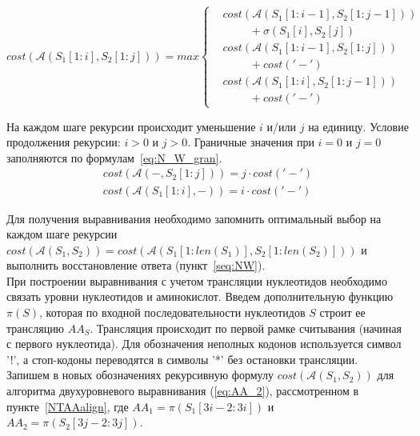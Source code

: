 \begin{equation}\label{eq:N_W_2}
cost(\mathcal{A}(S_1[1:i], S_2[1:j])) = max\left\{
\begin{aligned}
& cost(\mathcal{A}(S_1[1:i-1], S_2[1:j-1]))\\
& \hspace{1cm} + \sigma(S_1[i], S_2[j])\\
& cost(\mathcal{A}(S_1[1:i-1], S_2[1:j]))\\
& \hspace{1cm} + cost('-')\\
& cost(\mathcal{A}(S_1[1:i], S_2[1:j-1]))\\
& \hspace{1cm} + cost('-')
\end{aligned}
\right.
\end{equation}

\indent На каждом шаге рекурсии происходит уменьшение $i$ и/или $j$ на единицу. Условие продолжения рекурсии: $i > 0$ и $j > 0$. Граничные значения при $i=0$ и $j=0$ заполняются по формулам~\ref{eq:N_W_gran}.
\begin{equation}\label{eq:N_W_gran}
\begin{aligned}
cost(\mathcal{A}(-, S_2[1:j])) = j\cdot cost('-')\\
cost(\mathcal{A}(S_1[1:i], -)) = i\cdot cost('-')
\end{aligned}
\end{equation}

\indent Для получения выравнивания необходимо запомнить оптимальный выбор на каждом шаге рекурсии $cost(\mathcal{A}(S_1, S_2))=cost(\mathcal{A}(S_1[1:len(S_1)], S_2[1:len(S_2)]))$ и выполнить восстановление ответа (пункт~\ref{seq:NW}).\\
\indent При построении выравнивания с учетом трансляции нуклеотидов необходимо связать уровни нуклеотидов и аминокислот. Введем дополнительную функцию $\pi(S)$, которая по входной последовательности нуклеотидов $S$ строит ее трансляцию $AA_S$. Трансляция происходит по первой рамке считывания (начиная с первого нуклеотида). Для обозначения неполных кодонов используется символ '!', а стоп-кодоны переводятся в символы '*' без остановки трансляции.\\
\indent Запишем в новых обозначениях рекурсивную формулу $cost(\mathcal{A}(S_1, S_2))$ для алгоритма двухуровневого выравнивания (\ref{eq:AA_2}), рассмотренном в пункте~\ref{NTAAalign}, где $AA_1=\pi(S_1[3i-2:3i])$ и $AA_2=\pi(S_2[3j-2:3j])$.

